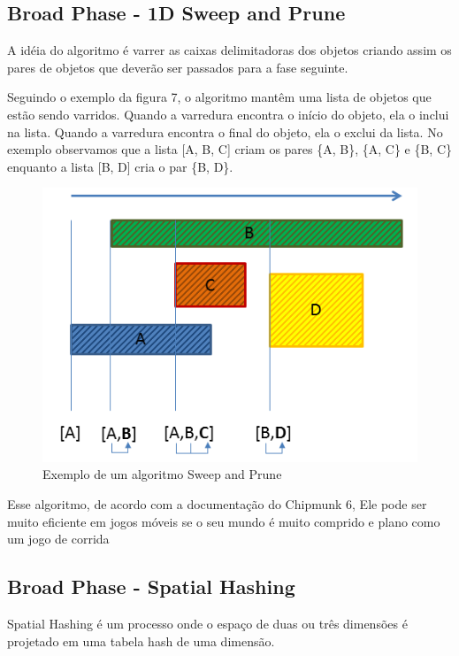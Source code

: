 \subsection{Broad Phase - 1D Sweep and Prune}

A idéia do algoritmo é varrer as caixas delimitadoras dos objetos criando assim os pares de objetos que deverão ser passados para a fase seguinte. 

Seguindo o exemplo da figura 7, o algoritmo mantêm uma lista de objetos que estão sendo varridos. Quando a varredura encontra o início do objeto, ela o inclui na lista. 
Quando a varredura encontra o final do objeto, ela o exclui da lista. No exemplo observamos que a lista [A, B, C] criam os pares \{A, B\}, \{A, C\} e \{B, C\} 
enquanto a lista [B, D] cria o par \{B, D\}. 

\begin{figure}[!htbp]
  \includegraphics[scale=0.7]{sp.png}
  \caption{Exemplo de um algoritmo Sweep and Prune}
\end{figure}

Esse algoritmo, de acordo com a documentação do Chipmunk 6, Ele pode ser muito eficiente em jogos móveis se o seu mundo é muito comprido e plano 
como um jogo de corrida

\subsection{Broad Phase - Spatial Hashing}

Spatial Hashing é um processo onde o espaço de duas ou três dimensões é projetado em uma tabela hash de uma dimensão. 
